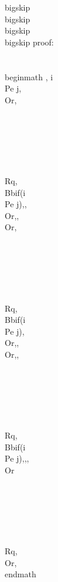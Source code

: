 \\[, i \\Pe j, \\Or, \\Rq , \\Or,\\]
\\bigskip
\\bigskip
\\bigskip
\\bigskip
proof:\\\\
\\begin{math} 
, i \\Pe j, \\Or, \\\\\\\\\\\\
\\Rq,  \\Bb{if(i \\Pe j)}{,}{,\\Or,}, \\Or,\\\\\\\\\\\\
\\Rq,  \\Bb{if(i \\Pe j)}{, \\Or,}{,\\Or,},\\\\\\\\\\\\
\\Rq,  \\Bb{if(i \\Pe j)}{,}{,},\\Or\\\\\\\\\\\\
\\Rq, \\Or,
\\end{math}


